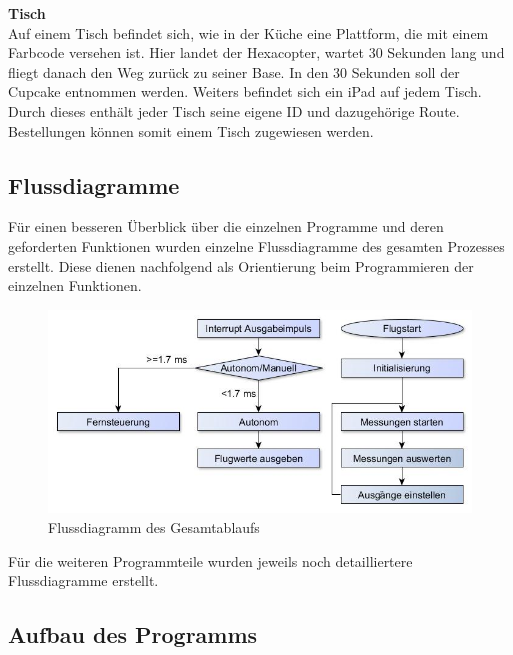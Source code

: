   \textbf{Tisch}\\
  Auf einem Tisch befindet sich, wie in der Küche eine Plattform, die mit einem Farbcode versehen ist. Hier landet der Hexacopter, wartet 30 Sekunden lang und fliegt danach den Weg zurück zu seiner Base. In den 30 Sekunden soll der Cupcake entnommen werden. Weiters befindet sich ein iPad auf jedem Tisch. Durch dieses enthält jeder Tisch seine eigene ID und dazugehörige Route. Bestellungen können somit einem Tisch zugewiesen werden.



  \subsection{Flussdiagramme}
  Für einen besseren Überblick über die einzelnen Programme und deren geforderten Funktionen wurden einzelne Flussdiagramme des gesamten Prozesses erstellt.
  Diese dienen nachfolgend als Orientierung beim Programmieren der einzelnen Funktionen.

  \begin{figure}[tbh]
    \begin{centering}
      \includegraphics[width = \textwidth]{Bilder/Flussdiagramm}
    \par\end{centering}
    \caption{Flussdiagramm des Gesamtablaufs}
    \label{Flussdiragramm}
  \end{figure}

  Für die weiteren Programmteile wurden jeweils noch detailliertere Flussdiagramme erstellt.

  \subsection{Aufbau des Programms}






